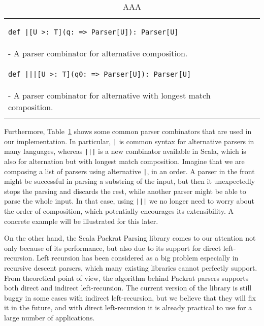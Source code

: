 \begin{table}[t]
\begin{tabular}{l}
\hline
\begin{lstlisting}
def |[U >: T](q: => Parser[U]): Parser[U]
\end{lstlisting} \\
\hspace{.2in}- A parser combinator for alternative composition. \\
\hline
\begin{lstlisting}
def |||[U >: T](q0: => Parser[U]): Parser[U]
\end{lstlisting} \\
\hspace{.2in}- A parser combinator for alternative with longest match composition. \\
\hline \\
\end{tabular}
\caption{AAA}\label{tab1}
\end{table}

Furthermore, Table~\ref{tab1} shows some common parser combinators that are used in our implementation.
In particular, \lstinline{|} is common syntax for alternative parsers in many languages, whereas \lstinline{|||} is a new combinator available in Scala, which is also for alternation but with longest match composition. Imagine that we are composing a list of parsers using alternative \lstinline{|}, in an order. A parser in the front might be successful in parsing a substring of the input, but then it unexpectedly stops the parsing and discards the rest, while another parser might be able to parse the whole input. In that case, using \lstinline{|||} we no longer need to worry about the order of composition, which potentially encourages its extensibility. A concrete example will be illustrated for this later.

On the other hand, the Scala Packrat Parsing library comes to our attention not only because of its performance, but also due to its support for direct left-recursion. Left recursion has been considered as a big problem especially in recursive descent parsers, which many existing libraries cannot perfectly support. From theoretical point of view, the algorithm behind Packrat parsers supports both direct and indirect left-recursion. The current version of the library is still buggy in some cases with indirect left-recursion, but we believe that they will fix it in the future, and with direct left-recursion it is already practical to use for a large number of applications.

